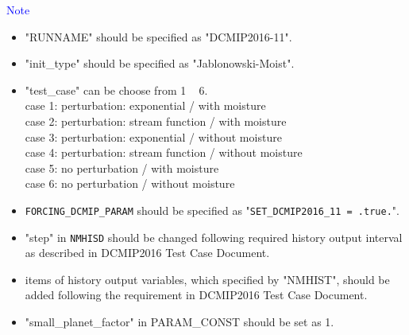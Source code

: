  \noindent \textcolor{blue}{{\sf Note}}
 \begin{itemize}
   \item "RUNNAME" should be specified as "DCMIP2016-11".
   \item "init\_type" should be specified as "Jablonowski-Moist".
   \item "test\_case" can be choose from 1 ~ 6.\\
          case 1: perturbation: exponential / with moisture \\
          case 2: perturbation: stream function / with moisture \\
          case 3: perturbation: exponential / without moisture \\
          case 4: perturbation: stream function / without moisture \\
          case 5: no perturbation / with moisture \\
          case 6: no perturbation / without moisture
   \item \verb|FORCING_DCMIP_PARAM| should be specified as "\verb|SET_DCMIP2016_11 = .true.|".
   \item "step" in \verb|NMHISD| should be changed following required history output interval
           as described in DCMIP2016 Test Case Document.
   \item items of history output variables, which specified by "NMHIST", should be added
         following the requirement in DCMIP2016 Test Case Document.
   \item "small\_planet\_factor" in PARAM\_CONST should be set as 1.
 \end{itemize}

 \vspace{0.5cm}

